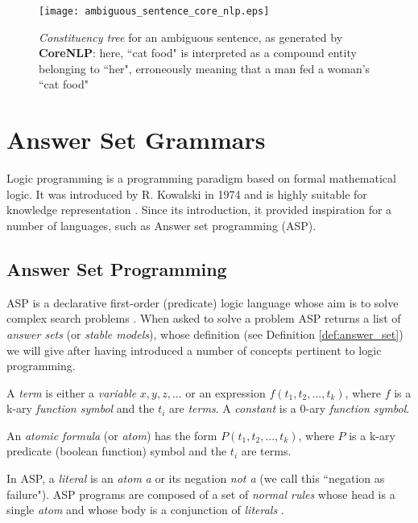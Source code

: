 \begin{figure}[H]
\centering
\texttt{[image: ambiguous\_sentence\_core\_nlp.eps]}
\caption{\textit{Constituency tree} for an ambiguous sentence, as generated by  \textbf{CoreNLP}: here, ``cat food" is interpreted as a compound entity belonging to ``her", erroneously meaning that a man fed a woman's ``cat food"}
\label{fig:dependency_tree_ambiguous_sentence}
\end{figure}

\section{Answer Set Grammars}
\label{sec:asg}

Logic programming is a programming paradigm based on formal mathematical logic. It was introduced by R. Kowalski in 1974 and is highly suitable for knowledge representation \cite{apt_logic_1990}. Since its introduction, it provided inspiration for a number of languages, such as Answer set programming (ASP).

\subsection{Answer Set Programming}

ASP is a declarative first-order (predicate) logic language whose aim is to solve complex search problems \cite{lifschitz_what_nodate}. When asked to solve a problem ASP returns a list of \textit{answer sets} (or \textit{stable models}), whose definition (see Definition \ref{def:answer_set}) we will give after having introduced a number of concepts pertinent to logic programming.

\begin{definition}
A \textit{term} is either a \textit{variable} $x,y,z,...$ or an expression $f(t_1,t_2,...,t_k)$, where $f$ is a k-ary \textit{function symbol} and the $t_i$ are \textit{terms}. A \textit{constant} is a 0-ary \textit{function symbol}.
\end{definition}

\begin{definition}
An \textit{atomic formula} (or \textit{atom}) has the form $P(t_1,t_2,...,t_k)$, where $P$ is a k-ary predicate (boolean function) symbol and the $t_i$ are terms.
\end{definition}

\noindent
In ASP, a \textit{literal} is an \textit{atom} \textit{a} or its negation \textit{not a} (we call this ``negation as failure"). ASP programs are composed of a set of \textit{normal rules} whose head is a single \textit{atom} and whose body is a conjunction of \textit{literals} \cite{law_representing_2019}.

